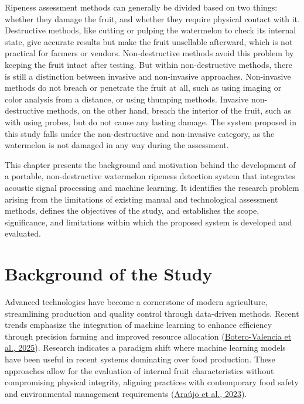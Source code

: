 \begin{thesisprose}
Ripeness assessment methods can generally be divided based on two things: whether they damage the fruit, and whether they require physical contact with it. Destructive methods, like cutting or pulping the watermelon to check its internal state, give accurate results but make the fruit unsellable afterward, which is not practical for farmers or vendors. Non-destructive methods avoid this problem by keeping the fruit intact after testing. But within non-destructive methods, there is still a distinction between invasive and non-invasive approaches. Non-invasive methods do not breach or penetrate the fruit at all, such as using imaging or color analysis from a distance, or using thumping methods. Invasive non-destructive methods, on the other hand, breach the interior of the fruit, such as with using probes, but do not cause any lasting damage. The system proposed in this study falls under the non-destructive and non-invasive category, as the watermelon is not damaged in any way during the assessment.

This chapter presents the background and motivation behind the development of a portable, non-destructive watermelon ripeness detection system that integrates acoustic signal processing and machine learning. It identifies the research problem arising from the limitations of existing manual and technological assessment methods, defines the objectives of the study, and establishes the scope, significance, and limitations within which the proposed system is developed and evaluated.

\section{Background of the Study}

Advanced technologies have become a cornerstone of modern agriculture, streamlining production and quality control through data-driven methods. Recent trends emphasize the integration of machine learning to enhance efficiency through precision farming and improved resource allocation (\hyperlink{cite.boterovalencia2025}{Botero-Valencia et al., 2025}). Research indicates a paradigm shift where machine learning models have been useful in recent systems dominating over food production. These approaches allow for the evaluation of internal fruit characteristics without compromising physical integrity, aligning practices with contemporary food safety and environmental management requirements (\hyperlink{cite.araujo2023}{Araújo et al., 2023}).


\end{thesisprose}
